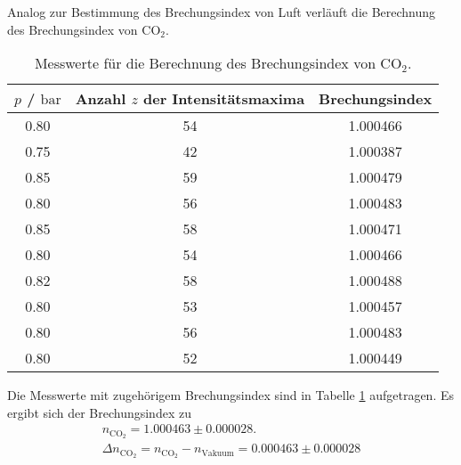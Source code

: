 Analog zur Bestimmung des Brechungsindex von Luft verläuft die Berechnung des
Brechungsindex von CO$_2$.

\begin{table}
	\caption{Messwerte für die Berechnung des Brechungsindex von \texorpdfstring{CO$_2$}{math}.}
	\label{tab:co2brech}
	\centering
	\begin{tabular}{ccc}
	\toprule
	$p$ / $\si{\bar}$ & Anzahl $z$ der Intensitätsmaxima & Brechungsindex \\
	\midrule
		0.80 & 54 & 1.000466 \\
		0.75 & 42 & 1.000387 \\
		0.85 & 59 & 1.000479 \\
		0.80 & 56 & 1.000483 \\
		0.85 & 58 & 1.000471 \\
		0.80 & 54 & 1.000466 \\
		0.82 & 58 & 1.000488 \\
		0.80 & 53 & 1.000457 \\
		0.80 & 56 & 1.000483 \\
		0.80 & 52 & 1.000449 \\
	\bottomrule
	\end{tabular}
\end{table}

Die Messwerte mit zugehörigem Brechungsindex sind in Tabelle \ref{tab:co2brech} aufgetragen.
Es ergibt sich der Brechungsindex zu
\begin{gather}
	n_{\mathrm{CO}_2} = 1.000463 \pm 0.000028 \mathrm{.}\\
  \Delta n_{\mathrm{CO}_2}=n_{\mathrm{CO}_2}-n_{\mathrm{Vakuum}}=0.000463\pm0.000028
\end{gather}
